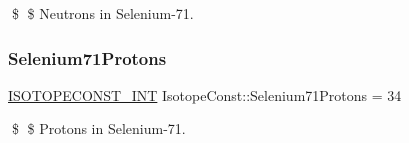 \$ \$ Neutrons in Selenium-\/71. \mbox{\label{group___isotope_const-_selenium-_se71_gad9bf0b52b214c1d459042663d5e19a86}} 
\subsubsection{\texorpdfstring{Selenium71\+Protons}{Selenium71Protons}}
{\footnotesize\ttfamily \mbox{\hyperlink{group___isotope_const-_macros_ga5f18360b3e99483a35c32d789e62621c}{I\+S\+O\+T\+O\+P\+E\+C\+O\+N\+S\+T\+\_\+\+I\+NT}} Isotope\+Const\+::\+Selenium71\+Protons = 34}

\$ \$ Protons in Selenium-\/71. 